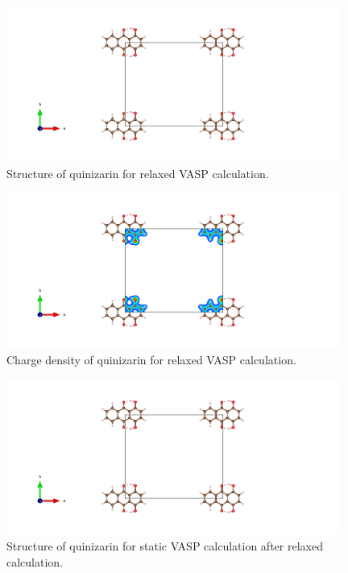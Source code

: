 \documentclass{article}
\begin{document}
  \begin{figure}[H]
      \centering
      \includegraphics[width = 11cm]{../fig/basic_relax_CONTCAR.png}
      \caption{Structure of quinizarin for relaxed VASP calculation. }
      \label{fig:basic_relax_CONTCAR}
  \end{figure}

  \begin{figure}[H]
      \centering
      \includegraphics[width = 11cm]{../fig/basic_relax_CHGCAR.png}
      \caption{Charge density of quinizarin for relaxed VASP calculation. }
      \label{fig:basic_relax_CHGCAR}
  \end{figure}

  \begin{figure}[H]
      \centering
      \includegraphics[width = 11cm]{../fig/basic_staticafter_CONTCAR.png}
      \caption{Structure of quinizarin for static VASP calculation after relaxed calculation. }
      \label{fig:basic_staticafter_CONTCAR}
  \end{figure}
\end{document}
